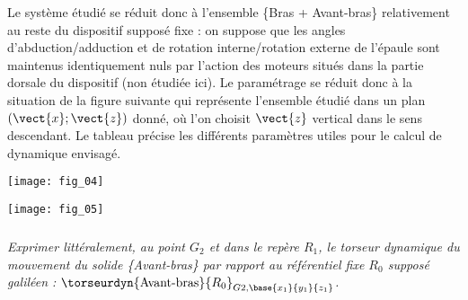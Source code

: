 \begin{multicols}{2}
Le système étudié se réduit donc à l’ensemble \{Bras + Avant-bras\} relativement au reste du dispositif supposé
fixe : on suppose que les angles d’abduction/adduction et de rotation interne/rotation externe de l’épaule sont
maintenus identiquement nuls par l’action des moteurs situés dans la partie dorsale du dispositif (non étudiée
ici). Le paramétrage se réduit donc à la situation de la figure suivante qui représente l’ensemble étudié dans un plan
$\left(\vect{x};\vect{z} \right)$ donné, où l’on choisit $\vect{z}$ vertical dans le sens descendant. Le tableau précise les différents
paramètres utiles pour le calcul de dynamique envisagé.

\begin{center}
\texttt{[image: fig\_04]}
\end{center}


\begin{center}
\texttt{[image: fig\_05]}
\end{center}


\subparagraph{}\textit{Exprimer littéralement, au point $G_2$ et dans le repère $R_1$, le torseur dynamique du mouvement du solide
\{Avant-bras\} par rapport au référentiel fixe $R_0$ supposé galiléen : $\torseurdyn{\text{Avant-bras}}{R_0}_{G2,\base{x_1}{y_1}{z_1}}$.}


\end{multicols}

